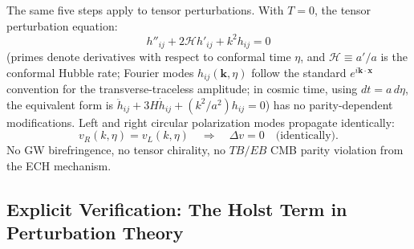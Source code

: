 \documentclass[aps,prd,twocolumn,superscriptaddress,showpacs,preprintnumbers,nofootinbib,longbibliography,floatfix]{revtex4-2}
\begin{document}
The same five steps apply to tensor perturbations. With $T=0$, the tensor
perturbation equation:
\begin{equation}
h''_{ij} + 2\mathcal{H}h'_{ij} + k^2 h_{ij} = 0
\end{equation}
(primes denote derivatives with respect to conformal time $\eta$, and
$\mathcal{H}\equiv a'/a$ is the conformal Hubble rate; Fourier modes
$h_{ij}(\mathbf{k},\eta)$ follow the standard
$e^{i\mathbf{k}\cdot\mathbf{x}}$ convention for the transverse-traceless
amplitude; in cosmic time, using $dt = a\,d\eta$, the
equivalent form is $\ddot h_{ij} + 3H\dot h_{ij} + (k^2/a^2)h_{ij}=0$)
has no parity-dependent modifications. Left and right circular polarization
modes propagate identically:
\begin{equation}
v_R(k,\eta) = v_L(k,\eta) \quad\Rightarrow\quad \Delta v = 0 \quad\text{(identically)}.
\end{equation}
No GW birefringence, no tensor chirality, no $TB/EB$ CMB parity violation from
the ECH mechanism.

\subsection{Explicit Verification: The Holst Term in Perturbation Theory}\label{sec:transp_holst}
\end{document}
